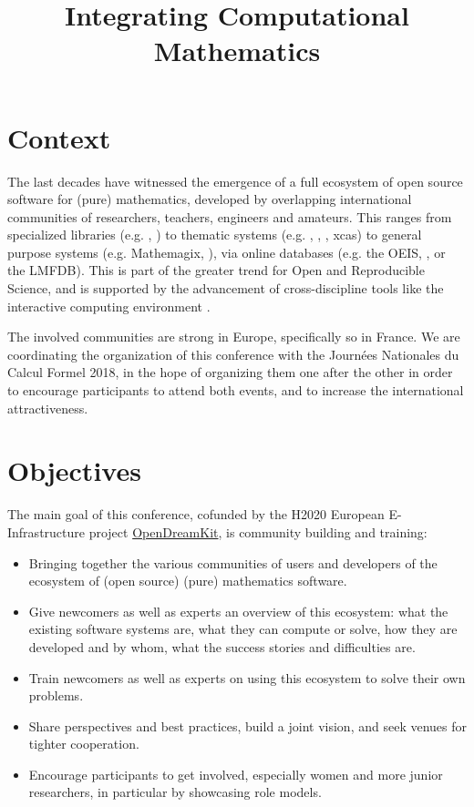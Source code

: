 \documentclass[12pt]{amsart}
\begin{document}
\title{Integrating Computational Mathematics}
\maketitle
\thispagestyle{empty}

\tableofcontents

\section{Context}

The last decades have witnessed the emergence of a full ecosystem of
open source software for (pure) mathematics, developed by overlapping
international communities of researchers, teachers, engineers and
amateurs. This ranges from specialized libraries (e.g. \MPIR, \Linbox)
to thematic systems (e.g. \GAP, \Pari, \Singular, xcas) to general
purpose systems (e.g. Mathemagix, \Sage), via online databases
(e.g. the OEIS, \MathHub, or the LMFDB). This is part of the greater
trend for Open and Reproducible Science, and is supported by the
advancement of cross-discipline tools like the interactive computing
environment \Jupyter.

The involved communities are strong in Europe, specifically so in
France. We are coordinating the organization of this conference with the Journées
Nationales du Calcul Formel 2018, in the hope of organizing them one
after the other in order to encourage participants to attend both
events, and to increase the international attractiveness.

\section{Objectives}

The main goal of this conference, cofunded by the H2020 European
E-Infrastructure project \href{opendreamkit.org}{OpenDreamKit}, is
community building and training:
\begin{itemize}
\item Bringing together the various communities of users and
  developers of the ecosystem of (open source) (pure) mathematics
  software.
\item Give newcomers as well as experts an overview of this ecosystem:
  what the existing software systems are, what they can compute or solve, how
  they are developed and by whom, what the success stories and
  difficulties are.
\item Train newcomers as well as experts on using this ecosystem to
  solve their own problems.
\item Share perspectives and best practices, build a joint vision, and
  seek venues for tighter cooperation.
\item Encourage participants to get involved, especially
  women and more junior researchers, in particular by showcasing role models.
\end{itemize}
\end{document}
